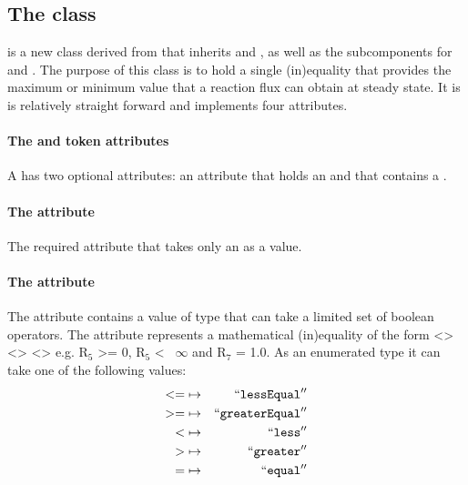 \subsection{The \FBC {} class}
\label{fluxbound-class}

\FluxBound is a new \FBC class derived from \SBML \SBase that inherits  and , as well as the subcomponents for \Annotation and \Notes. The purpose of this class is to hold a single (in)equality that provides the maximum or minimum value that a reaction flux can obtain at steady state. It is is relatively straight forward and implements four attributes.

\paragraph{The  and token  attributes}
A \FluxBound has two optional attributes:  an attribute that holds an  and  that contains a .

\paragraph{The  attribute}
The required  attribute that takes only an \SBML \Reaction {} as a value.

\paragraph{The  attribute}
The  attribute contains a value of type  that can take a limited set of boolean operators. The  attribute represents a mathematical (in)equality of the form <> <> <> e.g.
R$_{5}$ >= 0, R$_{5}$ <~ $\infty$ and R$_{7}$ = 1.0. As an enumerated type it can take one of the following values:
\begin{eqnarray*}
\label{fb-operation-enum}
 \nonumber
  <= & \mapsto & ``\textcolor{black}{\textup{\ttfamily{lessEqual}}}''\\
  >= & \mapsto & ``\textcolor{black}{\textup{\ttfamily{greaterEqual}}}''\\
  < & \mapsto & ``\textcolor{black}{\textup{\ttfamily{less}}}''\\
  > & \mapsto & ``\textcolor{black}{\textup{\ttfamily{greater}}}''\\
  = & \mapsto & ``\textcolor{black}{\textup{\ttfamily{equal}}}''
\end{eqnarray*}

